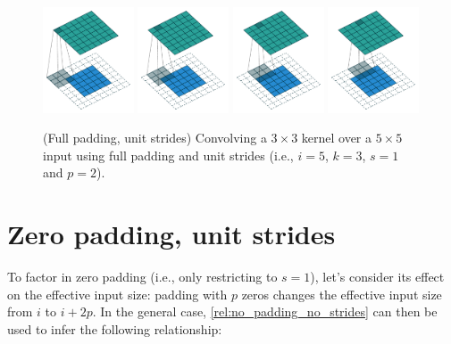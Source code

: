 \documentclass[notitlepage]{report}
\begin{document}
\begin{figure}[p]
    \centering
    \includegraphics[width=0.24\textwidth]{pdf/full_padding_no_strides_00.pdf}
    \includegraphics[width=0.24\textwidth]{pdf/full_padding_no_strides_01.pdf}
    \includegraphics[width=0.24\textwidth]{pdf/full_padding_no_strides_02.pdf}
    \includegraphics[width=0.24\textwidth]{pdf/full_padding_no_strides_03.pdf}
    \caption{\label{fig:full_padding_no_strides} (Full padding, unit strides)
        Convolving a $3 \times 3$ kernel over a $5 \times 5$ input using full
        padding and unit strides (i.e., $i = 5$, $k = 3$, $s = 1$ and $p = 2$).}
\end{figure}

\section{Zero padding, unit strides}

To factor in zero padding (i.e., only restricting to $s = 1$), let's consider
its effect on the effective input size: padding with $p$ zeros changes the
effective input size from $i$ to $i + 2p$. In the general case,
\autoref{rel:no_padding_no_strides} can then be used to infer the following
relationship:
\end{document}
